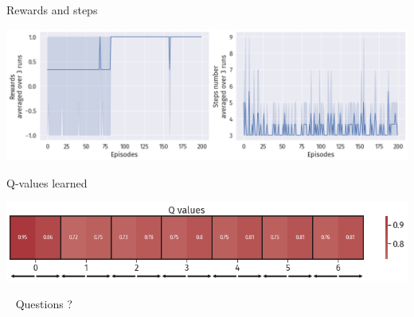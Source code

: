 \documentclass[bigger]{beamer}
\begin{document}
\begin{frame}[label={sec:org9879e0d}]{Rewards and steps}
\begin{center}
\includegraphics[width=.9\linewidth]{img/DRL-rewards-steps.png}
\end{center}
\end{frame}
\begin{frame}[label={sec:org0b9482a}]{Q-values learned}
\begin{center}
\includegraphics[width=\textwidth]{img/DRL-q-values.png}
\end{center}
\end{frame}
\begin{frame}[label={sec:org6feb5fe},standout]{~}
Questions ?
\end{frame}
\end{document}
